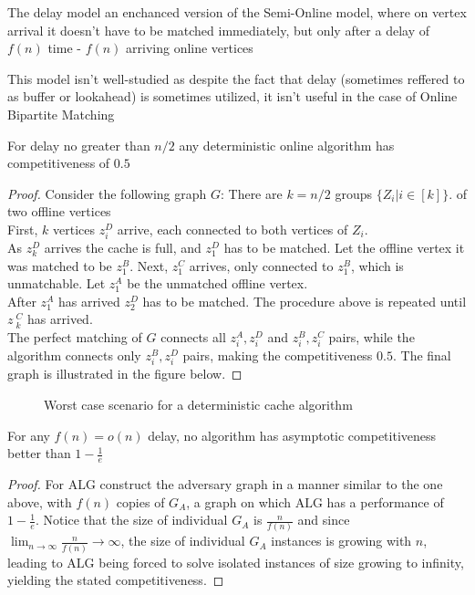 \begin{definition}
	The delay model an enchanced version of the Semi-Online model, where on vertex arrival it doesn't have to be matched immediately, but only after a delay of $f(n)$ time - $f(n)$ arriving online vertices
\end{definition}

This model isn't well-studied as despite the fact that delay (sometimes reffered to as buffer or lookahead) is sometimes utilized, it isn't useful in the case of Online Bipartite Matching

\begin{theorem}
	For delay no greater than $n/2$ any deterministic online algorithm has competitiveness of $0.5$
\end{theorem}

\begin{proof}
	Consider the following graph $G$: There are $k=n/2$ groups $\{Z_i|i\in[k]\}$. of two offline vertices\\
	First, $k$ vertices $z_i^D$ arrive, each connected to both vertices of $Z_i$.\\
	As $z_k^D$ arrives the cache is full, and $z_1^D$ has to be matched. Let the offline vertex it was matched to be $z_1^B$. Next, $z_1^C$ arrives, only connected to $z_1^B$, which is unmatchable. Let $z_1^A$ be the unmatched offline vertex.\\
	After $z_1^A$ has arrived $z_2^D$ has to be matched. The procedure above is repeated until $z\
	_k^C$ has arrived.\\
	The perfect matching of $G$ connects all $z_i^A,z_i^D$ and $z_i^B,z_i^C$ pairs, while the algorithm connects only $z_i^B,z_i^D$ pairs, making the competitiveness $0.5$. The final graph is illustrated in the figure below.
\end{proof}

\begin{figure}[H]
	\centering
	\scalebox{.8}{}
	\caption{Worst case scenario for a deterministic cache algorithm}
\end{figure}

\begin{theorem}
	For any $f(n)=o(n)$ delay, no algorithm has asymptotic competitiveness better than $1-\frac{1}{e}$
\end{theorem}
\begin{proof}
	For $\mathrm{ALG}$ construct the adversary graph in a manner similar to the one above, with $f(n)$ copies of $G_A$, a graph on which $\mathrm{ALG}$ has a performance of $1-\frac{1}{e}$. Notice that the size of individual $G_A$ is $\frac{n}{f(n)}$ and since $\lim_{n\to\infty}\frac{n}{f(n)}\to\infty$, the size of individual $G_A$ instances is growing with $n$, leading to $\mathrm{ALG}$ being forced to solve isolated instances of size growing to infinity, yielding the stated competitiveness.
\end{proof}